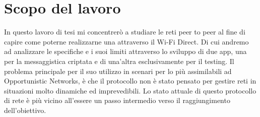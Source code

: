 \section*{Scopo del lavoro}

In questo lavoro di tesi mi concentrerò a studiare le reti peer to peer al 
fine di capire come poterne realizzarne una attraverso il Wi-Fi Direct.
Di cui andremo ad analizzare le specifiche e i suoi limiti attraverso lo sviluppo
di due app, una per la messaggistica criptata e di una'altra esclusivamente per il 
testing. Il problema principale per il suo utilizzo in scenari per lo
più assimilabili ad Opportunistic Networks, è che il protocollo non è stato pensato per
gestire reti in situazioni molto dinamiche ed imprevedibili. Lo stato attuale di questo
protocollo di rete è più vicino all’essere un passo intermedio verso il raggiungimento
dell’obiettivo.




